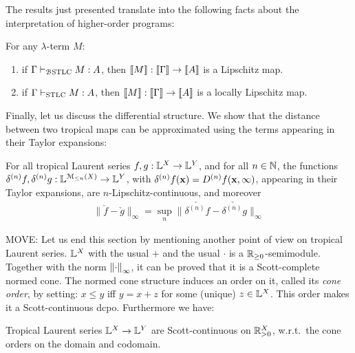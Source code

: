 The results just presented translate into the following facts about the interpretation of higher-order programs:
\begin{corollary}
For any $\lambda$-term $M$:
\begin{enumerate}
\item if $\Gamma \vdash_{\mathcal{B}\mathrm{STLC}} M:A$, then $\llbracket M\rrbracket:\llbracket\Gamma\rrbracket \to \llbracket A\rrbracket$ is a Lipschitz map.
\item if $\Gamma \vdash_{\mathrm{STLC}}M:A$, then $\llbracket M\rrbracket: \llbracket\Gamma\rrbracket \to \llbracket A\rrbracket$ is a locally Lipschitz map.
\end{enumerate}
\end{corollary} 


Finally, let us discuss the differential structure. We show that the distance between two tropical maps can be approximated using the terms appearing in their Taylor expansions:
\begin{proposition}
For all tropical Laurent series $f,g: \mathbb{L}^{X}\to \mathbb{L}^{Y}$, and for all $n\in \mathbb{N}$, 
the functions
$\delta^{(n)}f, \delta^{(n)}g: \mathbb{L}^{\mathcal{M}_{\leq n}(X)}\to \mathbb{L} ^{Y}$, with 
 $\delta^{(n)}f(\B x)= \Der^{(n)}f(\B x, \infty)$, appearing in their Taylor expansions, are $n$-Lipschitz-continuous, and moreover 
\begin{align}
\| \check f-\check g\|_{\infty}= \sup_{n} \| \check{\delta^{(n)}f}- \check{\delta^{(n)}g}\|_{\infty}
\end{align}
\end{proposition} 




{\color{red}MOVE:
Let us end this section by mentioning another point of view on tropical Laurent series.
$\mathbb{L}^X$ with the usual $+$ and the usual $\cdot$ is a $\mathbb{R}_{\geq0}$-semimodule.
Together with the norm $\left\lVert\cdot\right\rVert_\infty$, it can be proved that it is a Scott-complete normed cone.
The normed cone structure induces an order on it, called its \emph{cone order}, by setting:
$x\leq y$ iff $y=x+z$ for some (unique) $z\in\mathbb{L}^X$.
This order makes it a Scott-continuous dcpo.
Furthermore we have:

\begin{proposition}
  Tropical Laurent series $\mathbb{L}^X\to\mathbb{L}^Y$ are Scott-continuous on $\mathbb{R}_{>0}^X$, w.r.t.\ the cone orders on the domain and codomain.
\end{proposition}
}
